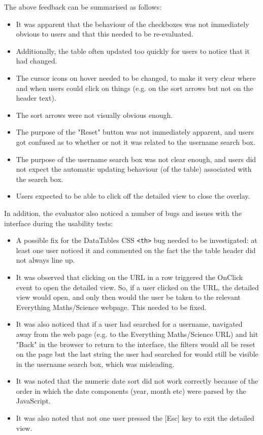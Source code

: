 The above feedback can be summarised as follows:
\begin{itemize}
\item It was apparent that the behaviour of the checkboxes was not immediately obvious to users and that this needed to be re-evaluated. 
\item Additionally, the table often updated too quickly for users to notice that it had changed. 
\item The cursor icons on hover needed to be changed, to make it very clear where and when users could click on things (e.g. on the sort arrows but not on the header text). 
\item The sort arrows were not visually obvious enough.
\item The purpose of the "Reset" button was not immediately apparent, and users got confused as to whether or not it was related to the username search box. 
\item The purpose of the username search box was not clear enough, and users did not expect the automatic updating behaviour (of the table) associated with the search box. 
\item Users expected to be able to click off the detailed view to close the overlay. 
\end{itemize}
In addition, the evaluator also noticed a number of bugs and issues with the interface during the usability tests:
\begin{itemize}
\item A possible fix for the DataTables CSS \verb|<th>| bug needed to be investigated: at least one user noticed it and commented on the fact the the table header did not always line up.
 \item It was observed that clicking on the URL in a row triggered the OnClick event to open the detailed view. So, if a user clicked on the URL, the detailed view would open, and only then would the user be taken to the relevant Everything Maths/Science webpage. This needed to be fixed. 
\item It was also noticed that if a user had searched for a username, navigated away from the web page (e.g. to the Everything Maths/Science URL) and hit "Back" in the browser to return to the interface, the filters would all be reset on the page but the last string the user had searched for would still be visible in the username search box, which was misleading. 
\item It was noted that the numeric date sort did not work correctly because of the order in which the date components (year, month etc) were parsed by the JavaScript. 
\item It was also noted that not one user pressed the [Esc] key to exit the detailed view. 
\end{itemize}

